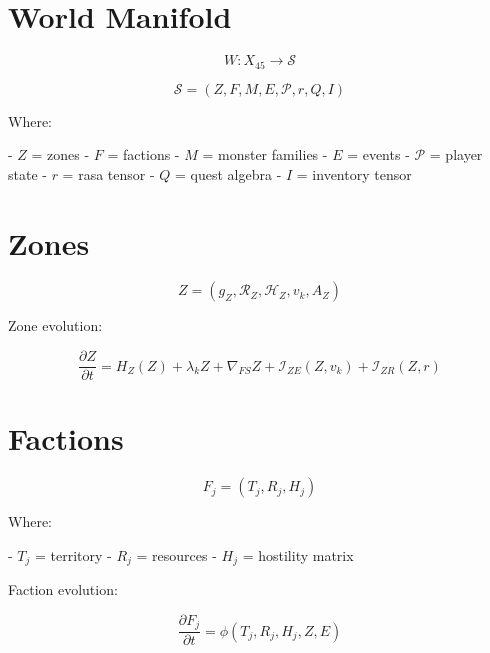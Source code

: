 
\section*{World Manifold}

\[
W : X_{45} \to \mathcal{S}
\]

\[
\mathcal{S}
= (Z, F, M, E, \mathcal{P}, r, Q, I)
\]

Where:

- \(Z\) = zones  
- \(F\) = factions  
- \(M\) = monster families  
- \(E\) = events  
- \(\mathcal{P}\) = player state  
- \(r\) = rasa tensor  
- \(Q\) = quest algebra  
- \(I\) = inventory tensor  


\section*{Zones}

\[
Z = (g_Z, \mathcal{R}_Z, \mathcal{H}_Z, v_k, A_Z)
\]

Zone evolution:

\[
\frac{\partial Z}{\partial t}
= H_Z(Z)
+ \lambda_k Z
+ \nabla_{FS} Z
+ \mathcal{I}_{ZE}(Z, v_k)
+ \mathcal{I}_{ZR}(Z, r)
\]


\section*{Factions}

\[
F_j = (T_j, R_j, H_j)
\]

Where:

- \(T_j\) = territory  
- \(R_j\) = resources  
- \(H_j\) = hostility matrix  

Faction evolution:

\[
\frac{\partial F_j}{\partial t}
= \phi(T_j, R_j, H_j, Z, E)
\]


